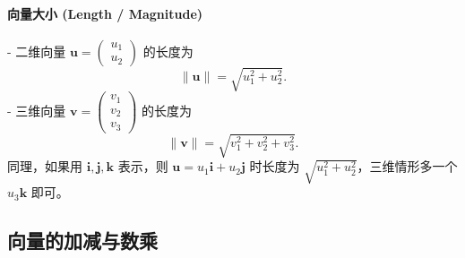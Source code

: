 \documentclass[8pt,a4paper,twoside]{tau-class/tau}
\begin{document}
\paragraph{向量大小 (Length / Magnitude)}
- 二维向量 \(\mathbf{u} = \begin{pmatrix}u_1\\u_2\end{pmatrix}\) 的长度为
\[
\|\mathbf{u}\| = \sqrt{u_1^2 + u_2^2}.
\]
- 三维向量 \(\mathbf{v} = \begin{pmatrix}v_1\\v_2\\v_3\end{pmatrix}\) 的长度为
\[
\|\mathbf{v}\| = \sqrt{v_1^2 + v_2^2 + v_3^2}.
\]
同理，如果用 \(\mathbf{i},\mathbf{j},\mathbf{k}\) 表示，则 \(\mathbf{u} = u_1\mathbf{i} + u_2\mathbf{j}\) 时长度为 \(\sqrt{u_1^2 + u_2^2}\)，三维情形多一个 \(u_3\mathbf{k}\) 即可。

\subsection{向量的加减与数乘}
\end{document}
